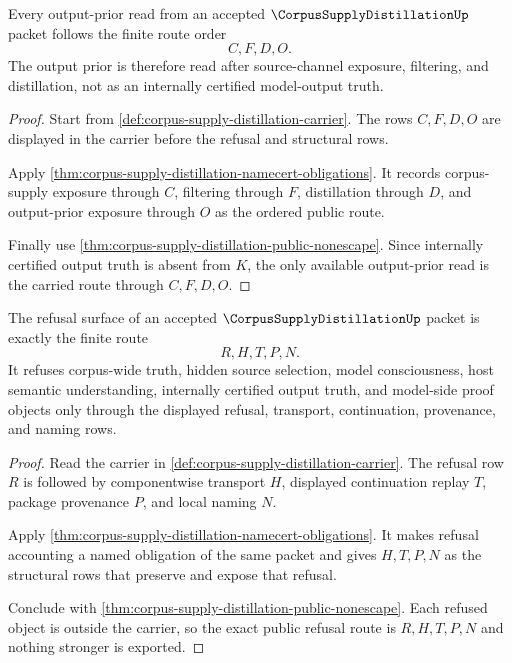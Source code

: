 \begin{theorem}
\label{thm:corpus-supply-distillation-filter-distillation-output-prior-order}
Every output-prior read from an accepted $\CorpusSupplyDistillationUp$ packet follows the finite route order
$$
C,F,D,O.
$$
The output prior is therefore read after source-channel exposure, filtering, and distillation, not as an internally certified model-output truth.
\end{theorem}
\begin{proof}
Start from \autoref{def:corpus-supply-distillation-carrier}. The rows $C,F,D,O$ are displayed in the carrier before the refusal and structural rows.

Apply \autoref{thm:corpus-supply-distillation-namecert-obligations}. It records corpus-supply exposure through $C$, filtering through $F$, distillation through $D$, and output-prior exposure through $O$ as the ordered public route.

Finally use \autoref{thm:corpus-supply-distillation-public-nonescape}. Since internally certified output truth is absent from $K$, the only available output-prior read is the carried route through $C,F,D,O$.
\end{proof}

\begin{theorem}
\label{thm:corpus-supply-distillation-refusal-exactness}
The refusal surface of an accepted $\CorpusSupplyDistillationUp$ packet is exactly the finite route
$$
R,H,T,P,N.
$$
It refuses corpus-wide truth, hidden source selection, model consciousness, host semantic understanding, internally certified output truth, and model-side proof objects only through the displayed refusal, transport, continuation, provenance, and naming rows.
\end{theorem}
\begin{proof}
Read the carrier in \autoref{def:corpus-supply-distillation-carrier}. The refusal row $R$ is followed by componentwise transport $H$, displayed continuation replay $T$, package provenance $P$, and local naming $N$.

Apply \autoref{thm:corpus-supply-distillation-namecert-obligations}. It makes refusal accounting a named obligation of the same packet and gives $H,T,P,N$ as the structural rows that preserve and expose that refusal.

Conclude with \autoref{thm:corpus-supply-distillation-public-nonescape}. Each refused object is outside the carrier, so the exact public refusal route is $R,H,T,P,N$ and nothing stronger is exported.
\end{proof}

